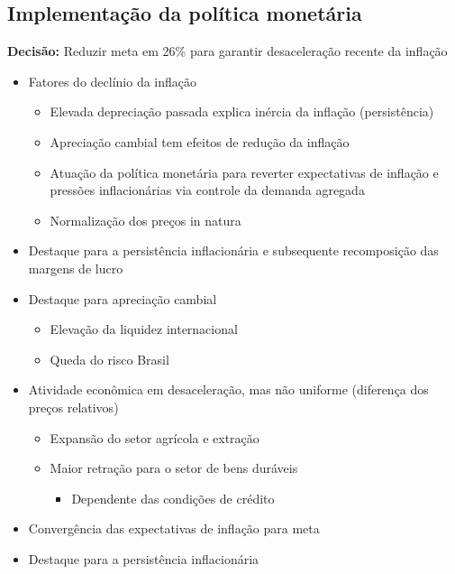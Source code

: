 \documentclass[11pt]{article}
\begin{document}
\subsection*{Implementação da política monetária}
\label{sec:org0551f9e}
\textbf{Decisão:} Reduzir meta em 26\% para garantir desaceleração recente da inflação
\begin{itemize}
\item Fatores do declínio da inflação
\begin{itemize}
\item Elevada depreciação passada explica inércia da inflação (persistência)
\item Apreciação cambial tem efeitos de redução da inflação
\item Atuação da política monetária para reverter expectativas de inflação e pressões inflacionárias via controle da demanda agregada
\item Normalização dos preços in natura
\end{itemize}
\item Destaque para a persistência inflacionária e subsequente recomposição das margens de lucro
\item Destaque para apreciação cambial
\begin{itemize}
\item Elevação da liquidez internacional
\item Queda do risco Brasil
\end{itemize}
\item Atividade econômica em desaceleração, mas não uniforme (diferença dos preços relativos)
\begin{itemize}
\item Expansão do setor agrícola e extração
\item Maior retração para o setor de bens duráveis 
\begin{itemize}
\item Dependente das condições de crédito
\end{itemize}
\end{itemize}
\item Convergência das expectativas de inflação para meta
\item Destaque para a persistência inflacionária
\end{itemize}
\end{document}
